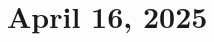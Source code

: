 \documentclass[11pt,                                          %
               a4paper,                                       %
               openany,                                                    oneside]{report}                               %
\begin{document}

\pagestyle{plain} 


\chapter*{April 16, 2025}

\end{document}
